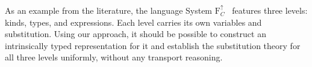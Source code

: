 \documentclass[manuscript,screen,review,anonymous,acmsmall]{acmart}
\begin{document}
As an example from the literature, the language System
$\mathrm{F}^{\uparrow}_{C}$~\cite{10.1145/2103786.2103795}
features three levels: kinds, types, and
expressions. Each level carries its own variables
and substitution. Using our approach, it should be possible to construct
an intrinsically typed representation for it and establish the
substitution theory for all three levels uniformly, without any transport
reasoning.

% 
% 
% 
% 
% 
% 
% 
\end{document}
